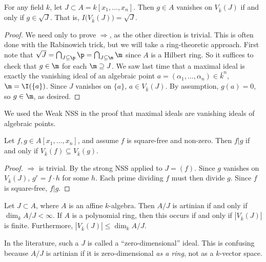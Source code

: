  \begin{theorem}
   For any field $k$, let $J\subset A=k[x_1,\dots, x_n]$. Then $g\in A$ vanishes on $V_{\bar
   k}(J)$ if and only if $g\in \sqrt J$. That is, $I\bigl(V_{\bar k}(J)\bigr)=\sqrt J$.
 \end{theorem}
 \begin{proof}
   We need only to prove $\Rightarrow$, as the other direction is trivial. This is often
   done with the Rabinowich trick, but we will take a ring-theoretic approach. First note
   that $\sqrt J = \bigcap_{J\subseteq \p} \p =\bigcap_{J\subseteq \m}\m$ since $A$ is a
   Hilbert ring. So it suffices to check that $g\in \m$ for each $\m\supseteq J$. We saw
   last time that a maximal ideal is exactly the vanishing ideal of an algebraic
   point $a=(\alpha_1,\dots, \alpha_n)\in \bar k^n$, $\m=\I(\{a\})$. Since $J$ vanishes on
   $\{a\}$, $a\in V_{\bar k}(J)$. By assumption, $g(a)=0$, so $g\in \m$, as desired.
 \end{proof}
 \begin{remark}
   We used the Weak NSS in the proof that maximal ideals are vanishing ideals of
   algebraic points.
 \end{remark}
 \begin{corollary}
   Let $f,g\in A[x_1,\dots, x_n]$, and assume $f$ is square-free and non-zero. Then $f|g$
   if and only if $V_{\bar k}(f)\subseteq V_{\bar k}(g)$.
 \end{corollary}
 \begin{proof}
   $\Rightarrow$ is trivial. By the strong NSS applied to $J=(f)$. Since $g$ vanishes on
   $V_{\bar k}(J)$, $g^r=f\cdot h$ for some $h$. Each prime dividing $f$ must then divide
   $g$. Since $f$ is square-free, $f|g$.
 \end{proof}
 \begin{theorem}
   Let $J\subset A$, where $A$ is an affine $k$-algebra. Then $A/J$ is artinian if and only if
   $\dim_k A/J< \infty$. If $A$ is a polynomial ring, then this occurs if and only if
   $|V_{\bar k}(J)|$ is finite. Furthermore, $|V_{\bar k}(J)|\le \dim_k A/J$.
 \end{theorem}
 \begin{warning}
   In the literature, such a $J$ is called a ``zero-dimensional'' ideal. This is confusing
   because $A/J$ is artinian if it is zero-dimensional \emph{as a ring}, not as a
   $k$-vector space.
 \end{warning}
